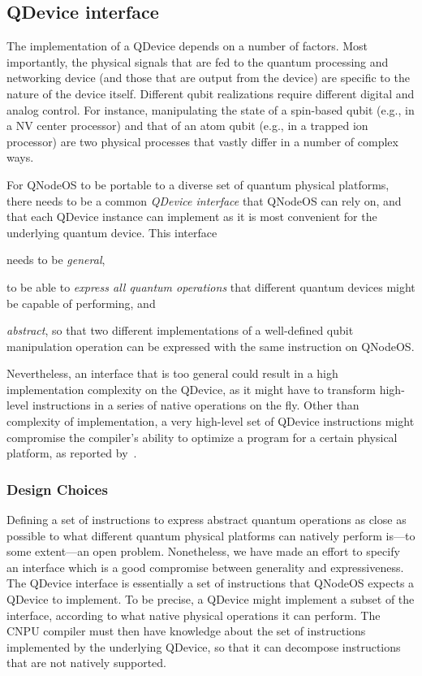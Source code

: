 \subsection{QDevice interface}
\label{qnodeos:sec:appendix-qdevice}

The implementation of a \ac{QDevice} depends on a number of factors. Most importantly, the physical signals that are fed to the quantum processing and networking device (and those that are output from the device) are specific to the nature of the device itself. Different qubit realizations require different digital and analog control. For instance, manipulating the state of a spin-based qubit (e.g., in a \ac{NV} center processor) and that of an atom qubit (e.g., in a trapped ion processor) are two physical processes that vastly differ in a number of complex ways.

For \ac{QNodeOS} to be portable to a diverse set of quantum physical platforms, there needs to be a common \emph{\ac{QDevice} interface} that \ac{QNodeOS} can rely on, and that each \ac{QDevice} instance can implement as it is most convenient for the underlying quantum device. This interface \begin{inlinelist} \item needs to be \emph{general}, \item to be able to \emph{express all quantum operations} that different quantum devices might be capable of performing, and \item \emph{abstract}, so that two different implementations of a well-defined qubit manipulation operation can be expressed with the same instruction on \ac{QNodeOS}.\end{inlinelist} Nevertheless, an interface that is too general could result in a high implementation complexity on the \ac{QDevice}, as it might have to transform high-level instructions in a series of native operations on the fly. Other than complexity of implementation, a very high-level set of \ac{QDevice} instructions might compromise the compiler's ability to optimize a program for a certain physical platform, as reported by~\textcite{murali_2019_fullstack}.

\subsubsection{Design Choices}

Defining a set of instructions to express abstract quantum operations as close as possible to what different quantum physical platforms can natively perform is---to some extent---an open problem. Nonetheless, we have made an effort to specify an interface which is a good compromise between generality and expressiveness. The \ac{QDevice} interface is essentially a set of instructions that \ac{QNodeOS} expects a \ac{QDevice} to implement. To be precise, a \ac{QDevice} might implement a subset of the interface, according to what native physical operations it can perform. The CNPU compiler must then have knowledge about the set of instructions implemented by the underlying \ac{QDevice}, so that it can decompose instructions that are not natively supported.

